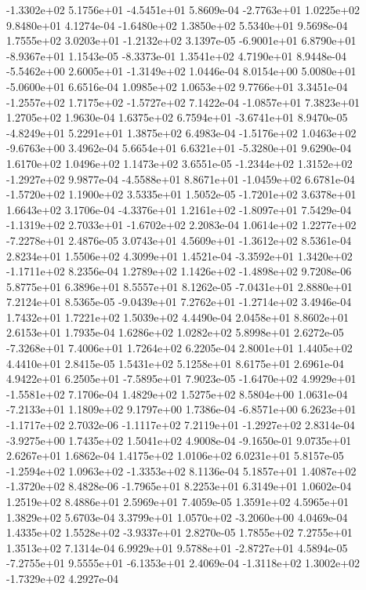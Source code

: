 -1.3302e+02  5.1756e+01 -4.5451e+01  5.8609e-04
-2.7763e+01  1.0225e+02  9.8480e+01  4.1274e-04
-1.6480e+02  1.3850e+02  5.5340e+01  9.5698e-04
 1.7555e+02  3.0203e+01 -1.2132e+02  3.1397e-05
-6.9001e+01  6.8790e+01 -8.9367e+01  1.1543e-05
-8.3373e-01  1.3541e+02  4.7190e+01  8.9448e-04
-5.5462e+00  2.6005e+01 -1.3149e+02  1.0446e-04
 8.0154e+00  5.0080e+01 -5.0600e+01  6.6516e-04
1.0985e+02 1.0653e+02 9.7766e+01  3.3451e-04
-1.2557e+02  1.7175e+02 -1.5727e+02  7.1422e-04
-1.0857e+01  7.3823e+01  1.2705e+02  1.9630e-04
 1.6375e+02  6.7594e+01 -3.6741e+01  8.9470e-05
-4.8249e+01  5.2291e+01  1.3875e+02  6.4983e-04
-1.5176e+02  1.0463e+02 -9.6763e+00  3.4962e-04
 5.6654e+01  6.6321e+01 -5.3280e+01  9.6290e-04
1.6170e+02 1.0496e+02 1.1473e+02  3.6551e-05
-1.2344e+02  1.3152e+02 -1.2927e+02  9.9877e-04
-4.5588e+01  8.8671e+01 -1.0459e+02  6.6781e-04
-1.5720e+02  1.1900e+02  3.5335e+01  1.5052e-05
-1.7201e+02  3.6378e+01  1.6643e+02  3.1706e-04
-4.3376e+01  1.2161e+02 -1.8097e+01  7.5429e-04
-1.1319e+02  2.7033e+01 -1.6702e+02  2.2083e-04
 1.0614e+02  1.2277e+02 -7.2278e+01  2.4876e-05
 3.0743e+01  4.5609e+01 -1.3612e+02  8.5361e-04
2.8234e+01 1.5506e+02 4.3099e+01  1.4521e-04
-3.3592e+01  1.3420e+02 -1.1711e+02  8.2356e-04
 1.2789e+02  1.1426e+02 -1.4898e+02  9.7208e-06
5.8775e+01 6.3896e+01 8.5557e+01  8.1262e-05
-7.0431e+01  2.8880e+01  7.2124e+01  8.5365e-05
-9.0439e+01  7.2762e+01 -1.2714e+02  3.4946e-04
1.7432e+01 1.7221e+02 1.5039e+02  4.4490e-04
2.0458e+01 8.8602e+01 2.6153e+01  1.7935e-04
1.6286e+02 1.0282e+02 5.8998e+01  2.6272e-05
-7.3268e+01  7.4006e+01  1.7264e+02  6.2205e-04
2.8001e+01 1.4405e+02 4.4410e+01  2.8415e-05
1.5431e+02 5.1258e+01 8.6175e+01  2.6961e-04
 4.9422e+01  6.2505e+01 -7.5895e+01  7.9023e-05
-1.6470e+02  4.9929e+01 -1.5581e+02  7.1706e-04
1.4829e+02 1.5275e+02 8.5804e+00  1.0631e-04
-7.2133e+01  1.1809e+02  9.1797e+00  1.7386e-04
-6.8571e+00  6.2623e+01 -1.1717e+02  2.7032e-06
-1.1117e+02  7.2119e+01 -1.2927e+02  2.8314e-04
-3.9275e+00  1.7435e+02  1.5041e+02  4.9008e-04
-9.1650e-01  9.0735e+01  2.6267e+01  1.6862e-04
1.4175e+02 1.0106e+02 6.0231e+01  5.8157e-05
-1.2594e+02  1.0963e+02 -1.3353e+02  8.1136e-04
 5.1857e+01  1.4087e+02 -1.3720e+02  8.4828e-06
-1.7965e+01  8.2253e+01  6.3149e+01  1.0602e-04
1.2519e+02 8.4886e+01 2.5969e+01  7.4059e-05
1.3591e+02 4.5965e+01 1.3829e+02  5.6703e-04
 3.3799e+01  1.0570e+02 -3.2060e+00  4.0469e-04
 1.4335e+02  1.5528e+02 -3.9337e+01  2.8270e-05
1.7855e+02 7.2755e+01 1.3513e+02  7.1314e-04
 6.9929e+01  9.5788e+01 -2.8727e+01  4.5894e-05
-7.2755e+01  9.5555e+01 -6.1353e+01  2.4069e-04
-1.3118e+02  1.3002e+02 -1.7329e+02  4.2927e-04
